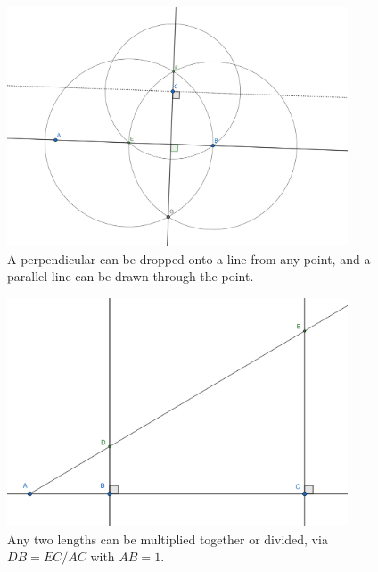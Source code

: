 \documentclass[handout]{beamer}
\begin{document}
    \begin{frame}
        \begin{figure}
        \begin{center}
            \includegraphics[width=0.9\textwidth]{perpendicular_parallel_.png}
        \end{center}
        \caption{A perpendicular can be dropped onto a line from any point, and a
        parallel line can be drawn through the point.}
        \label{fig:perpendicular_parallel}
        \end{figure}
    \end{frame}

    \begin{frame}
        \begin{figure}
        \begin{center}
            \includegraphics[width=0.9\textwidth]{multiply_divide_.png}
        \end{center}
        \caption{Any two lengths can be multiplied together or divided, via $DB =
        EC / AC$ with $AB = 1$.}
        \label{fig:multiply_divide}
        \end{figure}
    \end{frame}
\end{document}
